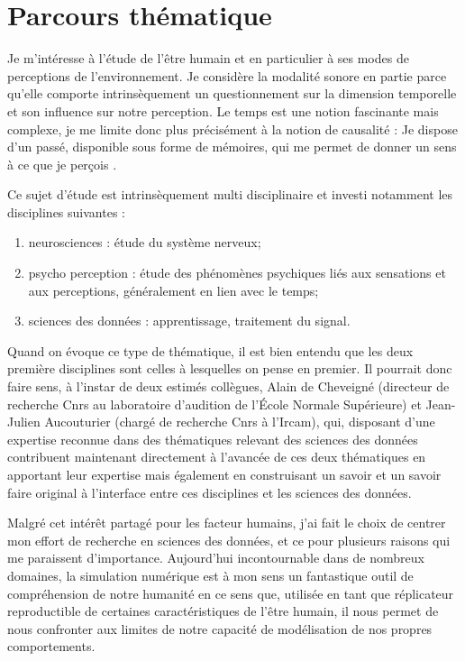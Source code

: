 \chapter{\nmu Parcours  thématique} \label{chap:themes}

Je m'intéresse à l'étude de l'être humain et en particulier à ses modes de perceptions de l'environnement. Je considère la modalité sonore en partie parce qu'elle comporte intrinsèquement un questionnement sur la dimension temporelle et son influence sur notre perception. Le temps est une notion fascinante mais complexe, je me limite donc plus précisément à la notion de causalité : \og Je dispose d'un passé, disponible sous forme de mémoires, qui me permet de donner un sens à ce que je perçois \fg.


Ce sujet d'étude est intrinsèquement multi disciplinaire et investi notamment les disciplines suivantes :
\begin{enumerate}
  \item neurosciences : étude du système nerveux;
  \item psycho perception : étude des phénomènes psychiques liés aux sensations et aux perceptions, généralement en lien avec le temps;
  \item sciences des données : apprentissage, traitement du signal.
\end{enumerate}

Quand on évoque ce type de thématique, il est bien entendu que les deux première disciplines sont  celles à lesquelles on pense en premier. Il pourrait donc faire sens, à l'instar de deux estimés collègues, Alain de Cheveigné (directeur de recherche Cnrs au laboratoire d'audition de l'\'Ecole Normale Supérieure) et Jean-Julien Aucouturier (chargé de recherche Cnrs à l'Ircam), qui, disposant d'une expertise reconnue dans des thématiques relevant des sciences des données contribuent maintenant directement à l'avancée de ces deux thématiques en apportant leur expertise mais également en construisant un savoir et un savoir faire original à l'interface entre ces disciplines et les sciences des données.

Malgré cet intérêt partagé pour les facteur humains, j'ai fait le choix de centrer mon effort de recherche en sciences des données, et ce pour plusieurs raisons qui me paraissent d'importance. Aujourd'hui incontournable dans de nombreux domaines, la simulation numérique est à mon sens un fantastique outil de compréhension de notre humanité en ce sens que, utilisée en tant que \og réplicateur reproductible \fg de certaines caractéristiques de l'être humain, il nous permet de nous confronter aux limites de notre capacité de modélisation de nos propres comportements.

